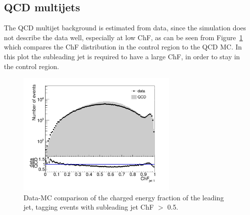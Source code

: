 \subsection{QCD multijets}

The \ac{QCD} multijet background is estimated from data, since the simulation does not describe the data well, especially at low ChF, as can be seen from Figure~\ref{fig:dataMC} which compares the ChF distribution in the control region to the \ac{QCD} MC. In this plot the subleading jet is required to have a large ChF, in order to stay in the control region.

\begin{figure}[ht]
  \centering
  \includegraphics[width=0.7\textwidth]{figures/bkgd_estimation_dataMC.pdf}\hfill%
  \caption{Data-MC comparison of the charged energy fraction of the leading jet, tagging events with subleading jet ChF $>$ 0.5.}
  \label{fig:dataMC}
\end{figure}

